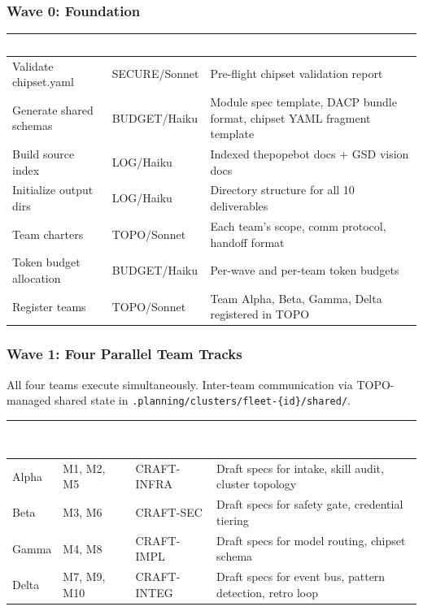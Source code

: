 \documentclass[11pt,letterpaper]{article}
\newcommand{\tableheader}[1]{\textbf{\sffamily\textcolor{white}{#1}}}
\begin{document}
\subsubsection{Wave 0: Foundation}

\begin{center}
\begin{tabularx}{\textwidth}{L{3.5cm}L{2.5cm}X}
\toprule
{}
\tableheader{Task} & \tableheader{Agent} & \tableheader{Output} \\
\midrule
Validate chipset.yaml & SECURE/Sonnet & Pre-flight chipset validation report \\
Generate shared schemas & BUDGET/Haiku & Module spec template, DACP bundle format, chipset YAML fragment template \\
Build source index & LOG/Haiku & Indexed thepopebot docs + GSD vision docs \\
Initialize output dirs & LOG/Haiku & Directory structure for all 10 deliverables \\
Team charters & TOPO/Sonnet & Each team's scope, comm protocol, handoff format \\
Token budget allocation & BUDGET/Haiku & Per-wave and per-team token budgets \\
Register teams & TOPO/Sonnet & Team Alpha, Beta, Gamma, Delta registered in TOPO \\
\end{tabularx}
\end{center}

\subsubsection{Wave 1: Four Parallel Team Tracks}

All four teams execute simultaneously. Inter-team communication via TOPO-managed shared state in \texttt{.planning/clusters/fleet-\{id\}/shared/}.

\begin{center}
\begin{tabularx}{\textwidth}{L{2.5cm}L{2cm}L{2.5cm}X}
\toprule
{}
\tableheader{Team} & \tableheader{Modules} & \tableheader{CRAFT Lead} & \tableheader{Tasks} \\
\midrule
Alpha & M1, M2, M5 & CRAFT-INFRA & Draft specs for intake, skill audit, cluster topology \\
Beta & M3, M6 & CRAFT-SEC & Draft specs for safety gate, credential tiering \\
Gamma & M4, M8 & CRAFT-IMPL & Draft specs for model routing, chipset schema \\
Delta & M7, M9, M10 & CRAFT-INTEG & Draft specs for event bus, pattern detection, retro loop \\
\end{tabularx}
\end{center}
\end{document}
